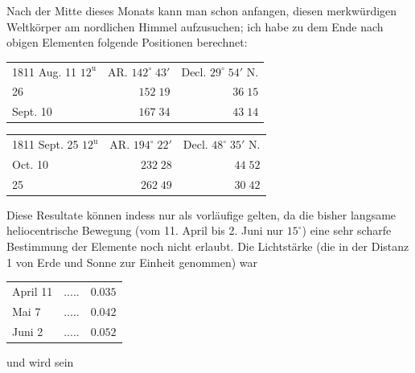 \par\indent Nach der Mitte dieses Monats kann man schon anfangen, diesen merkwürdigen Weltkörper am nordlichen Himmel aufzusuchen; ich habe zu dem Ende nach obigen Elementen folgende Positionen berechnet:

\begin{center}\fontsize{10}{12}\selectfont\setlength{\tabcolsep}{4pt}\renewcommand{\arraystretch}{1.15}\begin{tabular}{lrr}
1811 Aug. 11 $12^{\text{u}}$ & AR. $142^\circ\;43'$ & Decl. $29^\circ\;54'$ N.\\
26 & $152\;19$ & $36\;15$\\
Sept. 10 & $167\;34$ & $43\;14$\\
\end{tabular}\end{center}

\begin{center}\fontsize{10}{12}\selectfont\setlength{\tabcolsep}{4pt}\renewcommand{\arraystretch}{1.15}\begin{tabular}{lrr}
1811 Sept. 25 $12^{\text{u}}$ & AR. $194^\circ\;22'$ & Decl. $48^\circ\;35'$ N.\\
Oct. 10 & $232\;28$ & $44\;52$\\
25 & $262\;49$ & $30\;42$\\
\end{tabular}\end{center}

\par\indent Diese Resultate können indess nur als vorläufige gelten, da die bisher langsame heliocentrische Bewegung (vom 11. April bis 2. Juni nur $15^\circ$) eine sehr scharfe Bestimmung der Elemente noch nicht erlaubt. Die Lichtstärke (die in der Distanz 1 von Erde und Sonne zur Einheit genommen) war

\begin{center}\fontsize{10}{12}\selectfont\setlength{\tabcolsep}{4pt}\renewcommand{\arraystretch}{1.15}\begin{tabular}{llr}
April 11 & .\;.\;.\;.\;. & $0.035$\\
Mai 7 & .\;.\;.\;.\;. & $0.042$\\
Juni 2 & .\;.\;.\;.\;. & $0.052$\\
\end{tabular}\end{center}

\noindent und wird sein

